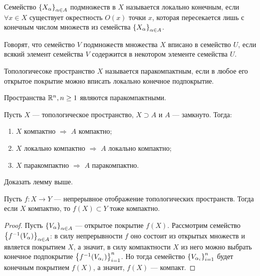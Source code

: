 \begin{definition}
    Семейство $\left\{X_{\alpha}\right\}_{\alpha \in A}$ подмножеств в $X$ называется локально конечным, если $\forall x \in X$ существует окрестность $O(x)$ точки $x$, которая пересекается лишь с конечным числом множеств из семейства $\left\{X_{\alpha}\right\}_{\alpha \in A}$.
\end{definition}

\begin{definition}
    Говорят, что семейство $V$ подмножеств множества $X$ вписано в семейство $U$, если всякий элемент семейства $V$ содержится в некотором элементе семейства $U$.
\end{definition}

\begin{definition}
    Топологичесоке пространство $X$ называется паракомпактным, если в любое его открытое покрытие можно вписать локально конечное подпокрытие.
\end{definition}

\begin{example}
    Пространства $\mathbb{R}^n, n \geq 1$ являются паракомпактными.
\end{example}

\begin{lemma}
    Пусть $X$ --- топологическое пространство, $X \supset A$ и $A$ --- замкнуто. Тогда:
    \begin{enumerate}
        \item $X$ компактно $\Rightarrow$ $A$ компактно;
        \item $X$ локально компактно $\Rightarrow$ $A$ локально компактно;
        \item $X$ паракомпактно $\Rightarrow$ $A$ паракомпактно.
    \end{enumerate}
\end{lemma}

\begin{exercise}
    Доказать лемму выше.
\end{exercise}

\begin{statement}
    Пусть $f: X \to Y$ --- непрерывное отображение топологических пространств.
    Тогда если $X$ компактно, то $f(X) \subset Y$ тоже компактно.
\end{statement}
\begin{proof}
    Пусть $\left\{V_{\alpha}\right\}_{\alpha \in A}$ --- открытое покрытие $f(X)$. Рассмотрим семейство $\left\{f^{-1}(V_{\alpha})\right\}_{\alpha \in A}$: в силу непрерывности $f$ оно состоит из открытых множеств и является покрытием $X$, а значит, в силу компактности $X$ из него можно выбрать конечное подпокрытие 
    $\left\{f^{-1}(V_{\alpha_{i}})\right\}_{i = 1}^{n}$. Но тогда семейство $\left\{V_{\alpha_{i}}\right\}_{i = 1}^{n}$ будет конечным покрытием $f(X)$, а значит, $f(X)$ --- компакт.
\end{proof}

